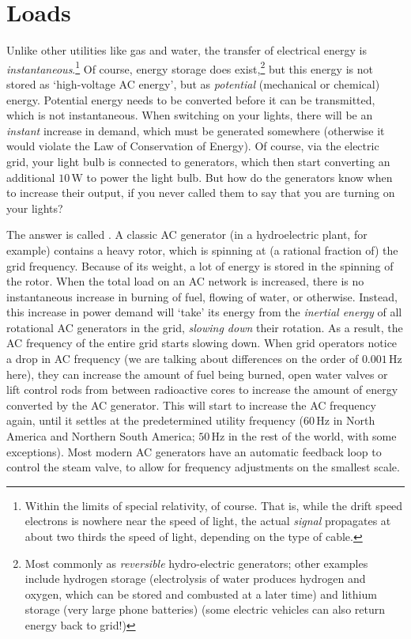 \documentclass[main.tex]{subfiles}
\begin{document}
\section{Loads}
Unlike other utilities like gas and water, the transfer of electrical energy is \emph{instantaneous}.\footnote{Within the limits of special relativity, of course. That is, while the drift speed electrons is nowhere near the speed of light, the actual \emph{signal} propagates at about two thirds the speed of light, depending on the type of cable.} Of course, energy storage does exist,\footnote{Most commonly as \emph{reversible} hydro-electric generators; other examples include hydrogen storage (electrolysis of water produces hydrogen and oxygen, which can be stored and combusted at a later time) and lithium storage (very large phone batteries) (some electric vehicles can also return energy back to grid!)} but this energy is not stored as `high-voltage AC energy', but as \emph{potential} (mechanical or chemical) energy. Potential energy needs to be converted before it can be transmitted, which is not instantaneous. When switching on your lights, there will be an \emph{instant} increase in demand, which must be generated somewhere (otherwise it would violate the Law of Conservation of Energy). Of course, via the electric grid, your light bulb is connected to generators, which then start converting an additional $10 \, \si{\watt}$ to power the light bulb. But how do the generators know when to increase their output, if you never called them to say that you are turning on your lights? 

The answer is called . A classic AC generator (in a hydroelectric plant, for example) contains a heavy rotor, which is spinning at (a rational fraction of) the grid frequency. Because of its weight, a lot of energy is stored in the spinning of the rotor. When the total load on an AC network is increased, there is no instantaneous increase in burning of fuel, flowing of water, or otherwise. Instead, this increase in power demand will `take' its energy from the \emph{inertial energy} of all rotational AC generators in the grid, \emph{slowing down} their rotation. As a result, the AC frequency of the entire grid starts slowing down. When grid operators notice a drop in AC frequency (we are talking about differences on the order of $0.001\,\si{\hertz}$ here), they can increase the amount of fuel being burned, open water valves or lift control rods from between radioactive cores to increase the amount of energy converted by the AC generator. This will start to increase the AC frequency again, until it settles at the predetermined utility frequency ($60\,\si{\hertz}$ in North America and Northern South America; $50\,\si{\hertz}$ in the rest of the world, with some exceptions).
Most modern AC generators have an automatic feedback loop to control the steam valve, to allow for frequency adjustments on the smallest scale.
\end{document}
